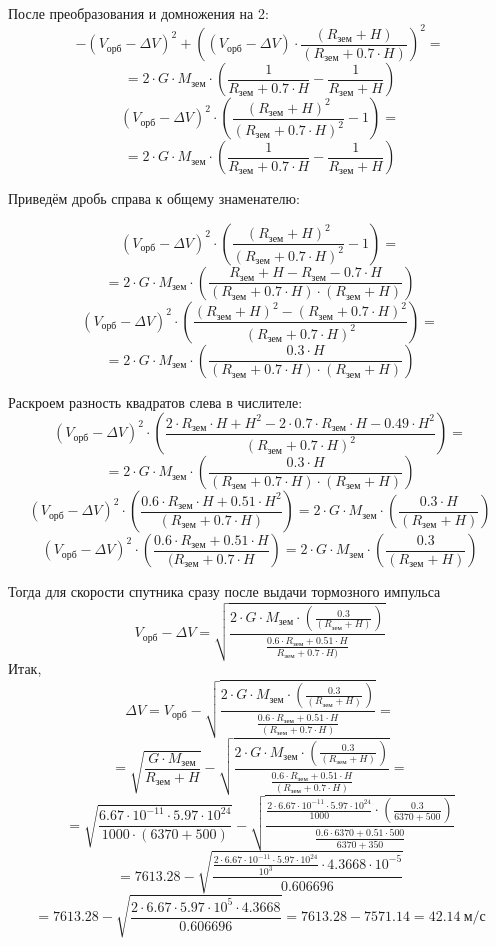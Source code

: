\begin{enumerate}
    После преобразования и домножения на 2:
    $$-(V_\text{орб}-\Delta V)^2+\left((V_\text{орб}-\Delta V)\cdot \frac{(R_\text{зем}+H)}{(R_\text{зем}+0.7\cdot H)} \right)^2=$$
    $$=2\cdot G \cdot M_\text{зем}\cdot \left(\frac{1}{R_\text{зем}+0.7\cdot H}-\frac{1}{R_\text{зем}+H}\right)$$
    $$(V_\text{орб}-\Delta V)^2\cdot \left(\frac{(R_\text{зем}+H)^2}{(R_\text{зем}+0.7\cdot H)^2} -1\right)=$$
    $$=2\cdot G\cdot M_\text{зем}\cdot \left(\frac{1}{R_\text{зем}+0.7\cdot H}-\frac{1}{R_\text{зем}+H}\right)$$
    
    Приведём дробь справа к общему знаменателю:
    
    $$(V_\text{орб}-\Delta V)^2 \cdot \left( \frac{(R_\text{зем}+H)^2}{(R_\text{зем}+0.7 \cdot H)^2} -1 \right)=$$
    $$=2 \cdot G \cdot M_\text{зем} \cdot \left( \frac{R_\text{зем}+H-R_\text{зем}-0.7 \cdot H}{(R_\text{зем}+0.7 \cdot H)\cdot(R_\text{зем}+H)} \right)$$    
    $$(V_\text{орб}-\Delta V)^2 \cdot \left(\frac{(R_\text{зем}+H)^2-(R_\text{зем}+0.7\cdot H)^2}{(R_\text{зем}+0.7\cdot H)^2}\right)=$$
    $$=2\cdot G \cdot M_\text{зем}\cdot \left(\frac{0.3\cdot H}{(R_\text{зем}+0.7 \cdot H)\cdot (R_\text{зем}+H)} \right)$$
    
    Раскроем разность квадратов слева в числителе:
    $$(V_\text{орб}-\Delta V)^2 \cdot \left(\frac{2\cdot R_\text{зем} \cdot H+H^2-2\cdot 0.7\cdot R_\text{зем}\cdot H-0.49\cdot H^2}{(R_\text{зем}+0.7\cdot H)^2} \right)=$$
    $$=2\cdot G\cdot M_\text{зем}\cdot \left(\frac{0.3\cdot H}{(R_\text{зем}+0.7\cdot H)\cdot (R_\text{зем}+H)}\right)$$
    $$(V_\text{орб}-\Delta V)^2\cdot \left(\frac{0.6\cdot R_\text{зем}\cdot H+0.51\cdot H^2}{(R_\text{зем}+0.7\cdot H)} \right)=2\cdot G \cdot M_\text{зем}\cdot \left(\frac{0.3\cdot H}{(R_\text{зем}+H)} \right)$$    
    $$(V_\text{орб}-\Delta V)^2 \cdot \left( \frac{0.6 \cdot R_\text{зем}+0.51 \cdot H}{(R_\text{зем}+0.7\cdot H} \right)=2\cdot G \cdot M_\text{зем}\cdot \left(\frac{0.3}{(R_\text{зем}+H)} \right)$$
    
    Тогда для скорости спутника сразу после выдачи тормозного импульса
    $$V_\text{орб}-\Delta V = \sqrt{\frac {2 \cdot G \cdot M_\text{зем}\cdot \left(\frac{0.3}{(R_\text{зем}+H)} \right)}{\frac{0.6\cdot R_\text{зем}+0.51\cdot H}{R_\text{зем}+0.7 \cdot H)}}}$$
    Итак,
    $$\Delta V = V_\text{орб} - \sqrt{\frac{2 \cdot G \cdot M_\text{зем} \cdot \left( \frac{0.3}{(R_\text{зем} + H)} \right)}{\frac{0.6 \cdot R_\text{зем} + 0.51 \cdot H}{(R_\text{зем} + 0.7 \cdot H)}}}=$$
    $$=\sqrt{\frac{G\cdot M_\text{зем}}{R_\text{зем}+H}}-\sqrt{\frac{2 \cdot G \cdot M_\text{зем} \cdot \left( \frac{0.3}{(R_\text{зем} + H)} \right)}{\frac{0.6 \cdot R_\text{зем} + 0.51 \cdot H}{(R_\text{зем} + 0.7 \cdot H)}}}=$$
    $$=\sqrt{\frac{6.67\cdot 10^{-11}\cdot 5.97\cdot 10^{24}}{1000\cdot (6370+500) }} -\sqrt{ \frac{ \frac{2\cdot 6.67\cdot 10^{-11}\cdot 5.97\cdot 10^{24}}{1000}\cdot \left(\frac{0.3}{6370+500}\right)}{\frac{0.6\cdot 6370+0.51\cdot 500}{6370+350}} }$$
    $$=7613.28-\sqrt{ \frac{ \frac{2\cdot 6.67\cdot 10^{-11}\cdot 5.97\cdot 10^24} {10^3} \cdot 4.3668 \cdot 10^{-5}}{0.606696}}$$
    $$=7613.28-\sqrt{\frac{2 \cdot 6.67 \cdot 5.97 \cdot 10^5 \cdot 4.3668}{0.606696}}=7613.28-7571.14=42.14 \:  \text{м/с}$$
    

\end{enumerate}
